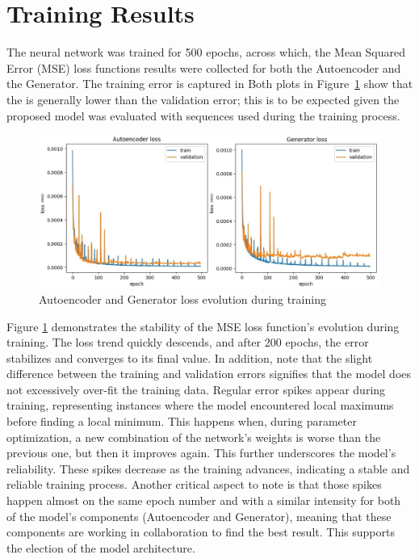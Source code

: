 \section{Training Results}
\label{sec:TrainingResults}

The neural network was trained for 500 epochs, across which, the Mean Squared Error (MSE) loss functions results were collected for both the Autoencoder and the Generator. The training error is captured in  Both plots in Figure~\ref{fig:loss} show that the is generally lower than the validation error; this is to be expected given the proposed model was evaluated with sequences used during the training process. 

\begin{figure}[H]
    \centering
    \includegraphics[width=1\linewidth]{images/model_training.png}
    \caption{Autoencoder and Generator loss evolution during training}
    \label{fig:loss}
\end{figure}

Figure \ref{fig:loss} demonstrates the stability of the MSE loss function's evolution during training. The loss trend quickly descends, and after 200 epochs, the error stabilizes and converges to its final value. In addition, note that the slight difference between the training and validation errors signifies that the model does not excessively over-fit the training data. Regular error spikes appear during training, representing instances where the model encountered local maximums before finding a local minimum. This happens when, during parameter optimization, a new combination of the network’s weights is worse than the previous one, but then it improves again. This further underscores the model's reliability. These spikes decrease as the training advances, indicating a stable and reliable training process. Another critical aspect to note is that those spikes happen almost on the same epoch number and with a similar intensity for both of the model's components (Autoencoder and Generator), meaning that these components are working in collaboration to find the best result. This supports the election of the model architecture.

